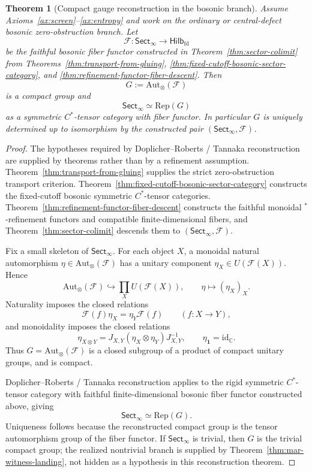 \documentclass[11pt]{article}
\newtheorem{theorem}{Theorem}[section]
\begin{document}
\begin{theorem}[Compact gauge reconstruction in the bosonic branch]\label{thm:compactgauge}
Assume Axioms~\ref{ax:screen}--\ref{ax:entropy} and work on the ordinary or central-defect
bosonic zero-obstruction branch. Let
\[
\mathcal F:\mathsf{Sect}_\infty\to\mathsf{Hilb}_{\mathrm{fd}}
\]
be the faithful bosonic fiber functor constructed in Theorem~\ref{thm:sector-colimit} from
Theorems~\ref{thm:transport-from-gluing},
\ref{thm:fixed-cutoff-bosonic-sector-category}, and
\ref{thm:refinement-functor-fiber-descent}. Then
\[
G:=\mathrm{Aut}_\otimes(\mathcal F)
\]
is a compact group and
\[
\mathsf{Sect}_\infty\simeq \mathrm{Rep}(G)
\]
as a symmetric \(C^*\)-tensor category with fiber functor. In particular \(G\) is uniquely
determined up to isomorphism by the constructed pair \((\mathsf{Sect}_\infty,\mathcal F)\).
\end{theorem}

\begin{proof}
The hypotheses required by Doplicher--Roberts / Tannaka reconstruction are supplied by
theorems rather than by a refinement assumption. Theorem~\ref{thm:transport-from-gluing} supplies
the strict zero-obstruction transport criterion. Theorem~\ref{thm:fixed-cutoff-bosonic-sector-category}
constructs the fixed-cutoff bosonic symmetric \(C^*\)-tensor categories.
Theorem~\ref{thm:refinement-functor-fiber-descent} constructs the faithful monoidal
\(^*\)-refinement functors and compatible finite-dimensional fibers, and
Theorem~\ref{thm:sector-colimit} descends them to \((\mathsf{Sect}_\infty,\mathcal F)\).

Fix a small skeleton of \(\mathsf{Sect}_\infty\). For each object \(X\), a monoidal natural
automorphism \(\eta\in\mathrm{Aut}_\otimes(\mathcal F)\) has a unitary component
\(\eta_X\in U(\mathcal F(X))\). Hence
\[
\mathrm{Aut}_\otimes(\mathcal F)
\hookrightarrow
\prod_X U(\mathcal F(X)),
\qquad
\eta\mapsto(\eta_X)_X.
\]
Naturality imposes the closed relations
\[
\mathcal F(f)\eta_X=\eta_Y\mathcal F(f)
\qquad(f:X\to Y),
\]
and monoidality imposes the closed relations
\[
\eta_{X\otimes Y}
=
J_{X,Y}(\eta_X\otimes\eta_Y)J_{X,Y}^{-1},
\qquad
\eta_{\mathbf 1}=\mathrm{id}_{\mathbb C}.
\]
Thus \(G=\mathrm{Aut}_\otimes(\mathcal F)\) is a closed subgroup of a product of compact unitary
groups, and is compact.

Doplicher--Roberts / Tannaka reconstruction applies to the rigid symmetric \(C^*\)-tensor
category with faithful finite-dimensional bosonic fiber functor constructed above, giving
\[
\mathsf{Sect}_\infty\simeq\mathrm{Rep}(G).
\]
Uniqueness follows because the reconstructed compact group is the tensor automorphism group of
the fiber functor. If \(\mathsf{Sect}_\infty\) is trivial, then \(G\) is the trivial compact group;
the realized nontrivial branch is supplied by Theorem~\ref{thm:mar-witness-landing}, not hidden as
a hypothesis in this reconstruction theorem.
\end{proof}
\end{document}

